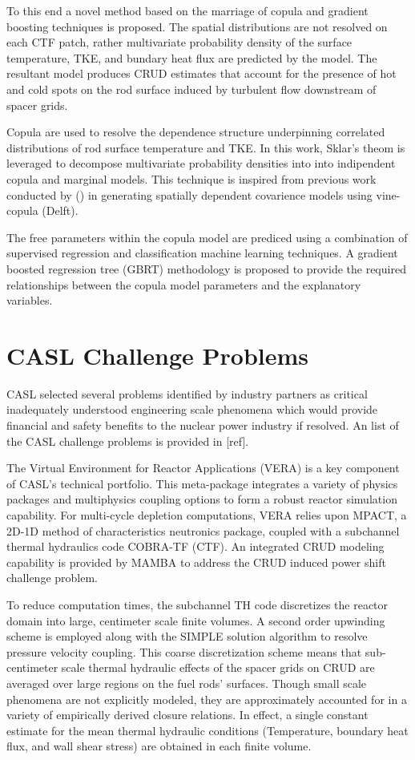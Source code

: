 To this end a novel method based on the marriage of copula and gradient boosting techniques
is proposed.  The spatial distributions are not resolved on each CTF patch, rather
multivariate probability density of the surface temperature, TKE, and bundary heat flux
are predicted by the model.
The resultant model produces CRUD estimates that account for the presence of
hot and cold spots on the rod surface induced by turbulent flow downstream of spacer grids.

Copula are used to resolve the dependence structure underpinning correlated distributions
of rod surface temperature and TKE.  In this work, Sklar's theom is leveraged
to decompose multivariate probability densities into into indipendent copula
and marginal models. This technique is inspired from previous work conducted by
() in generating spatially dependent covarience models using vine-copula (Delft).

The free parameters within the copula model are prediced using a combination of
supervised regression and classification machine learning techniques. A
gradient boosted regression tree (GBRT) methodology is proposed to provide the
required relationships between the copula model parameters and the
explanatory variables.

\section{CASL Challenge Problems}

CASL selected several problems identified by industry partners as critical
inadequately understood engineering scale phenomena which would provide financial and
safety benefits to the nuclear power industry if resolved.  An list of the CASL
challenge problems is provided in [ref].

The Virtual Environment for Reactor Applications (VERA) is a key component of
CASL's technical portfolio.  This meta-package integrates a variety of physics
packages and multiphysics coupling options to form a robust reactor simulation
capability.  For multi-cycle depletion computations, VERA relies upon MPACT, a
2D-1D method of characteristics neutronics package, coupled with a subchannel
thermal hydraulics code COBRA-TF (CTF).  An integrated CRUD modeling capability
is provided by MAMBA to address the CRUD induced power shift challenge problem.

To reduce computation times, the subchannel TH code discretizes the reactor
domain into large, centimeter scale finite volumes.  A second order upwinding
scheme is employed along with the SIMPLE solution algorithm to resolve pressure
velocity coupling.  This coarse discretization scheme means that sub-centimeter scale
thermal hydraulic effects of the spacer grids on CRUD are averaged over
large regions on the fuel rods' surfaces.  Though small scale phenomena are not
explicitly modeled, they are approximately accounted for in a variety of empirically derived
closure relations.  In effect, a single constant estimate for the mean thermal
hydraulic conditions (Temperature, boundary heat flux, and wall shear stress)
are obtained in each finite volume.

